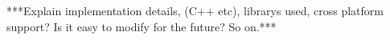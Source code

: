 \section{}

***Explain implementation details, (C++ etc), librarys used, cross platform support? Is it easy to modify for the future? So on.***